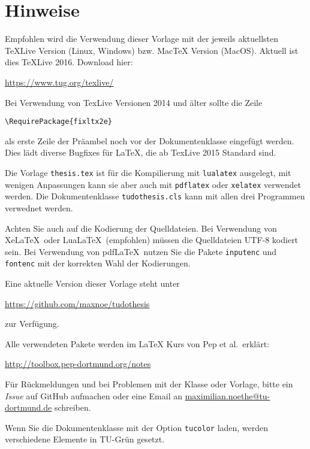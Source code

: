 \thispagestyle{empty}
\setcounter{page}{2}
\section*{Hinweise}
Empfohlen wird die Verwendung dieser Vorlage mit der jeweils aktuellsten TeXLive Version (Linux, Windows) bzw. MacTeX Version (MacOS).
Aktuell ist dies TeXLive 2016. Download hier:
\begin{center}
  \ttfamily\url{https://www.tug.org/texlive/}
\end{center}
Bei Verwendung von TexLive Versionen 2014 und älter sollte
die Zeile
\begin{center}
\verb+\RequirePackage{fixltx2e}+
\end{center}
als erste Zeile der Präambel noch vor der Dokumentenklasse eingefügt werden.
Dies lädt diverse Bugfixes für LaTeX, die ab TexLive 2015 Standard sind.

Die Vorlage \texttt{thesis.tex} ist für die Kompilierung mit \texttt{lualatex} ausgelegt, mit wenigen Anpassungen kann sie aber auch mit \texttt{pdflatex} oder \texttt{xelatex} verwendet werden.
Die Dokumentenklasse \texttt{tudothesis.cls} kann mit allen drei Programmen verwednet werden.

Achten Sie auch auf die Kodierung der Quelldateien.
Bei Verwendung von Xe\LaTeX\ oder Lua\LaTeX\ (empfohlen) müssen die
Quelldateien UTF-8 kodiert sein.
Bei Verwendung von pdf\LaTeX\ nutzen Sie die Pakete \texttt{inputenc} und \texttt{fontenc} mit der korrekten Wahl der Kodierungen.

Eine aktuelle Version dieser Vorlage steht unter
\begin{center}
  \ttfamily\url{https://github.com/maxnoe/tudothesis}
\end{center}
zur Verfügung.

Alle verwendeten Pakete werden im \LaTeX{} Kurs von Pep et al.\ erklärt:
\begin{center}
  \ttfamily\url{http://toolbox.pep-dortmund.org/notes}
\end{center}

Für Rückmeldungen und bei Problemen mit der Klasse oder Vorlage, bitte ein \emph{Issue} auf GitHub aufmachen oder eine Email an
\href{mailto:maximilian.noethe@tu-dortmund.de}{maximilian.noethe@tu-dortmund.de} schreiben.

Wenn Sie die Dokumentenklasse mit der Option \texttt{tucolor} laden, werden verschiedene Elemente in TU-Grün gesetzt.

